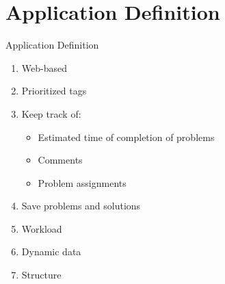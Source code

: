 \section*{Application Definition}
\begin{frame}{Application Definition}
\begin{enumerate}
\item Web-based
\item Prioritized tags
\item Keep track of:
	\begin{itemize}
		\item Estimated time of completion of problems
		\item Comments
		\item Problem assignments
	\end{itemize}
\item Save problems and solutions
\item Workload
\item Dynamic data
\item Structure
\end{enumerate}
\end{frame}

